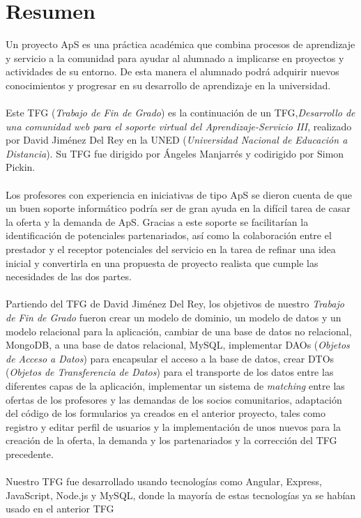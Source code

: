 \documentclass[11pt]{book}
\begin{document}
	\chapter*{Resumen} 
	Un proyecto ApS es una práctica académica que combina procesos de aprendizaje y servicio a la comunidad para ayudar al alumnado a implicarse en proyectos y actividades de su entorno. De esta manera el alumnado podrá adquirir nuevos conocimientos y progresar en su desarrollo de aprendizaje en la universidad.\\\\
	Este TFG (\textit{Trabajo de Fin de Grado}) es la continuación de un TFG,\textit{Desarrollo de una comunidad web para el soporte virtual del Aprendizaje-Servicio III}, realizado por David Jiménez Del Rey en la UNED (\emph{Universidad Nacional de Educación a Distancia}). Su TFG fue dirigido por Ángeles Manjarrés y codirigido por Simon Pickin. \\\\
	Los profesores con experiencia en iniciativas de tipo ApS se dieron cuenta de que un buen soporte informático podría ser de gran ayuda en la difícil tarea de casar la oferta y la demanda de ApS. Gracias a este soporte se facilitarían la identificación de potenciales partenariados, así como la colaboración entre el prestador y el receptor potenciales del servicio en la tarea de refinar una idea inicial y convertirla en una propuesta de proyecto realista que cumple las necesidades de las dos partes.\\\\ 
	Partiendo del TFG de David Jiménez Del Rey, los objetivos de nuestro \textit{Trabajo de Fin de Grado} fueron crear un modelo de dominio, un modelo de datos y un modelo relacional para la aplicación, cambiar de una base de datos no relacional, MongoDB, a una base de datos relacional, MySQL, implementar DAOs (\emph{Objetos de Acceso a Datos}) para encapsular el acceso a la base de datos, crear DTOs (\emph{Objetos de Transferencia de Datos}) para el transporte de los datos entre las diferentes capas de la aplicación, implementar un sistema de \textit{matching} entre las ofertas de los profesores y las demandas de los socios comunitarios, adaptación del código de los formularios ya creados en el anterior proyecto, tales como registro y editar perfil de usuarios y la implementación de unos nuevos para la creación  de la oferta, la demanda y los partenariados y la corrección del TFG precedente.\\\\
	Nuestro TFG fue desarrollado usando tecnologías como Angular, Express, JavaScript, Node.js y MySQL, donde la mayoría de estas tecnologías ya se habían usado en el anterior TFG\\\\
	
\end{document}
